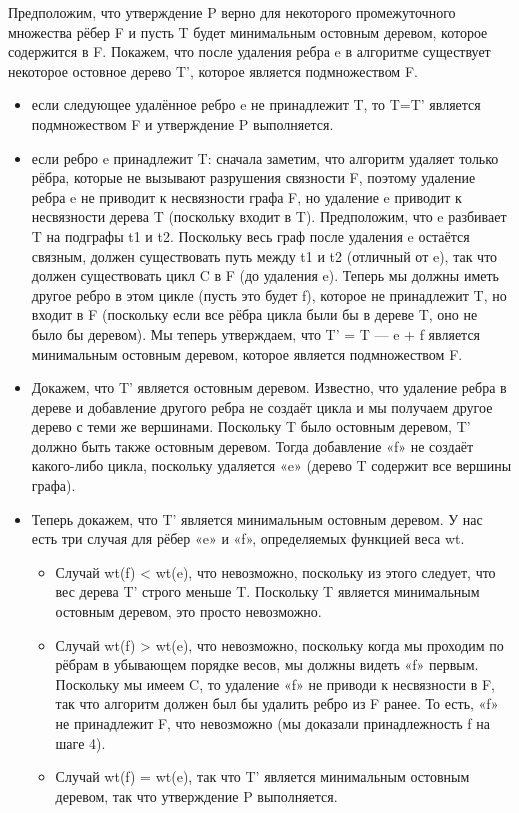 \begin{enumerate}
\begin{solution}
      Предположим, что утверждение P верно для некоторого промежуточного множества рёбер F и пусть T будет минимальным остовным деревом, которое содержится в F. Покажем, что после удаления ребра e в алгоритме существует некоторое остовное дерево T', которое является подмножеством F.
      \begin{itemize}
        \item если следующее удалённое ребро e не принадлежит T, то T=T' является подмножеством F и утверждение P выполняется.
        \item если ребро e принадлежит T: сначала заметим, что алгоритм удаляет только рёбра, которые не вызывают разрушения связности F, поэтому удаление ребра e не приводит к несвязности графа F, но удаление e приводит к несвязности дерева T (поскольку входит в T). Предположим, что e разбивает T на подграфы t1 и t2. Поскольку весь граф после удаления e остаётся связным, должен существовать путь между t1 и t2 (отличный от e), так что должен существовать цикл C в F (до удаления e). Теперь мы должны иметь другое ребро в этом цикле (пусть это будет f), которое не принадлежит T, но входит в F (поскольку если все рёбра цикла были бы в дереве T, оно не было бы деревом). Мы теперь утверждаем, что T' = T — e + f является минимальным остовным деревом, которое является подмножеством F.
        \item Докажем, что T' является остовным деревом. Известно, что удаление ребра в дереве и добавление другого ребра не создаёт цикла и мы получаем другое дерево с теми же вершинами. Поскольку T было остовным деревом, T' должно быть также остовным деревом. Тогда добавление «f» не создаёт какого-либо цикла, поскольку удаляется «e» (дерево T содержит все вершины графа).
        \item Теперь докажем, что T' является минимальным остовным деревом. У нас есть три случая для рёбер «e» и «f», определяемых функцией веса wt.
        \begin{itemize}
          \item Случай wt(f) < wt(e), что невозможно, поскольку из этого следует, что вес дерева T' строго меньше T. Поскольку T является минимальным остовным деревом, это просто невозможно.
          \item Случай wt(f) > wt(e), что невозможно, поскольку когда мы проходим по рёбрам в убывающем порядке весов, мы должны видеть «f» первым. Поскольку мы имеем C, то удаление «f» не приводи к несвязности в F, так что алгоритм должен был бы удалить ребро из F ранее. То есть, «f» не принадлежит F, что невозможно (мы доказали принадлежность f на шаге 4).
          \item Случай wt(f) = wt(e), так что T' является минимальным остовным деревом, так что утверждение P выполняется.
        \end{itemize}
      \end{itemize}
      

\end{solution}
\end{enumerate}

